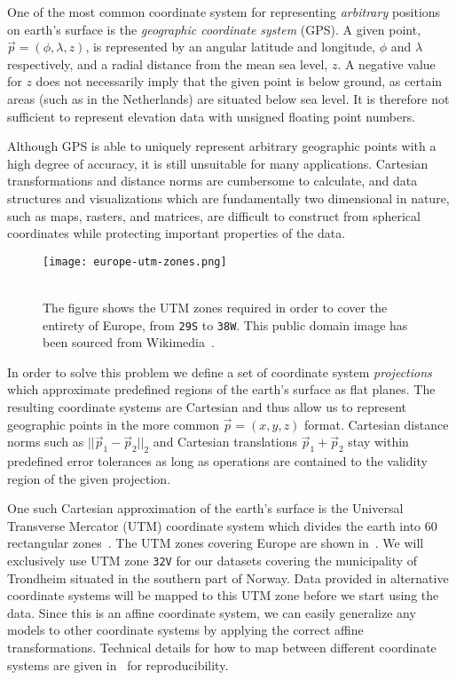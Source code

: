 One of the most common coordinate system for representing \textit{arbitrary} positions on earth's surface is the \textit{geographic coordinate system} (GPS).
A given point, $\vec{p} = (\phi, \lambda, z)$, is represented by an angular latitude and longitude, $\phi$ and $\lambda$ respectively, and a radial distance from the mean sea level, $z$.
A negative value for $z$ does not necessarily imply that the given point is below ground, as certain areas (such as in the Netherlands) are situated below sea level.
It is therefore not sufficient to represent elevation data with unsigned floating point numbers.

Although GPS is able to uniquely represent arbitrary geographic points with a high degree of accuracy, it is still unsuitable for many applications.
Cartesian transformations and distance norms are cumbersome to calculate, and data structures and visualizations which are fundamentally two dimensional in nature, such as maps, rasters, and matrices, are difficult to construct from spherical coordinates while protecting important properties of the data.

\begin{wrapfigure}[20]{r}{0.38\linewidth}
  \vspace{-1em}
  \centering
  \texttt{[image: europe-utm-zones.png]}
  \caption{%
    \\
    The figure shows the UTM zones required in order to cover the entirety of Europe, from \texttt{29S} to \texttt{38W}.
    This public domain image has been sourced from Wikimedia~\cite{wiki:europe_utm_zones}.
  }%
  \label{fig:europe-utm-zones}
\end{wrapfigure}

In order to solve this problem we define a set of coordinate system \textit{projections} which approximate predefined regions of the earth's surface as flat planes.
The resulting coordinate systems are Cartesian and thus allow us to represent geographic points in the more common $\vec{p} = (x, y, z)$ format.
Cartesian distance norms such as $||\vec{p}_1 - \vec{p}_2||_2$ and Cartesian translations $\vec{p}_1 + \vec{p}_2$ stay within predefined error tolerances as long as operations are contained to the validity region of the given projection.

One such Cartesian approximation of the earth's surface is the Universal Transverse Mercator (UTM) coordinate system which divides the earth into 60 rectangular zones~\cite[p.~48]{map-projections}. The UTM zones covering Europe are shown in~.
We will exclusively use UTM zone \texttt{32V} for our datasets covering the municipality of Trondheim situated in the southern part of Norway.
Data provided in alternative coordinate systems will be mapped to this UTM zone before we start using the data.
Since this is an affine coordinate system, we can easily generalize any models to other coordinate systems by applying the correct affine transformations.
Technical details for how to map between different coordinate systems are given in~ for reproducibility.
